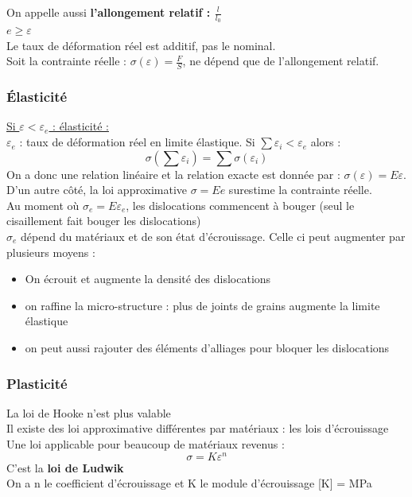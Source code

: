 \documentclass[../main.tex]{subfiles}
\begin{document}
On appelle aussi \textbf{l'allongement relatif : $\frac{l}{l_0}$}\\
\warning $e\geq \varepsilon$\\

\warning Le taux de déformation réel est additif, pas le nominal.\\
Soit la contrainte réelle : $\sigma(\varepsilon) = \frac{F}{S}$, ne dépend que de l'allongement relatif.\\

\subsubsection{Élasticité}
\quad \underline{Si $\varepsilon<\varepsilon_e$ : élasticité :}\\
$\varepsilon_e$ : taux de déformation réel en limite élastique. Si $\sum \varepsilon_i < \varepsilon_e$ alors :\\
\begin{equation}
    \sigma(\sum \varepsilon_i) = \sum \sigma(\varepsilon_i)
\end{equation}
On a donc une relation linéaire et la relation exacte est donnée par : $\sigma(\varepsilon) = E\varepsilon$. \\
D'un autre côté, la loi approximative $\sigma = Ee$ surestime la contrainte réelle.\\

Au moment où $\sigma_e = E \varepsilon_e$, les dislocations commencent à bouger (seul le cisaillement fait bouger les dislocations)\\

$\sigma_e$ dépend du matériaux et de son état d'écrouissage. Celle ci peut augmenter par plusieurs moyens :\\
\begin{itemize}
    \item On écrouit et augmente la densité des dislocations\\
    \item on raffine la micro-structure : plus de joints de grains augmente la limite élastique\\
    \item on peut aussi rajouter des éléments d'alliages pour bloquer les dislocations\\
\end{itemize}

\subsubsection{Plasticité}
La loi de Hooke n'est plus valable\\
Il existe des loi approximative différentes par matériaux : les lois d'écrouissage\\
Une loi applicable pour beaucoup de matériaux revenus : \\
\begin{equation}
    \sigma = K \varepsilon^n
\end{equation}
C'est la \textbf{loi de Ludwik}\\
On a n le coefficient d'écrouissage et K le module d'écrouissage [K] = MPa\\
\end{document}
